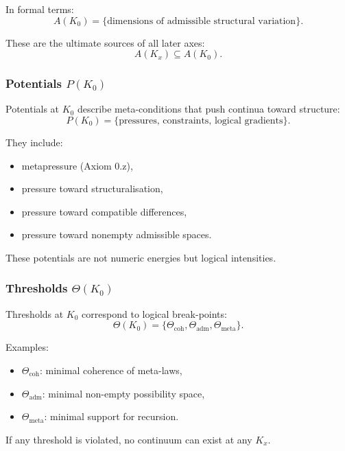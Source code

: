 In formal terms:
\[
A(K_0) = \{ \text{dimensions of admissible structural variation} \}.
\]

These are the ultimate sources of all later axes:
\[
A(K_x) \subseteq A(K_0).
\]

\subsubsection{Potentials \texorpdfstring{$P(K_0)$}{P(K_0)}}

Potentials at $K_0$ describe meta-conditions that push continua toward
structure:
\[
P(K_0) = \{ \text{pressures, constraints, logical gradients} \}.
\]

They include:
\begin{itemize}
    \item metapressure (Axiom 0.z),
    \item pressure toward structuralisation,
    \item pressure toward compatible differences,
    \item pressure toward nonempty admissible spaces.
\end{itemize}

These potentials are not numeric energies but logical intensities.

\subsubsection{Thresholds \texorpdfstring{$\Theta(K_0)$}{\Theta(K_0)}}

Thresholds at $K_0$ correspond to logical break-points:
\[
\Theta(K_0) = \{ \Theta_{\mathrm{coh}}, \Theta_{\mathrm{adm}}, 
                 \Theta_{\mathrm{meta}} \}.
\]

Examples:
\begin{itemize}
    \item $\Theta_{\mathrm{coh}}$: minimal coherence of meta-laws,
    \item $\Theta_{\mathrm{adm}}$: minimal non-empty possibility space,
    \item $\Theta_{\mathrm{meta}}$: minimal support for recursion.
\end{itemize}

If any threshold is violated, no continuum can exist at any $K_x$.

